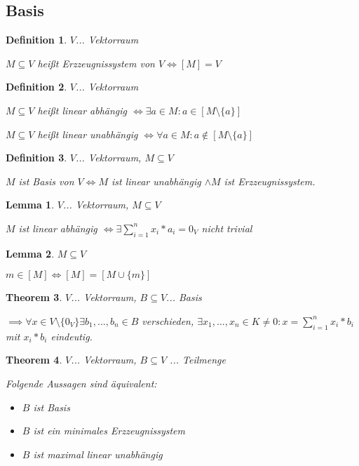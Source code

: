 \documentclass[twocolumn]{article}
\newtheorem{theorem}{Theorem}[section]
\newtheorem{lemma}[theorem]{Lemma}
\newtheorem{definition}{Definition}[section]
\newcommand*{\logeq}{\Leftrightarrow}
\begin{document}
\subsection{Basis}

\begin{definition}
	$V$... Vektorraum
	
	$M \subseteq V$ heißt Erzzeugnissystem von $V \logeq [M]=V$ 
\end{definition}

\begin{definition}
	$V$... Vektorraum
	
	$M \subseteq V$ heißt linear abhängig $\logeq \exists a \in M : a \in [M\setminus \{a\}]$
	
	$M \subseteq V$ heißt linear unabhängig $\logeq \forall a \in M : a \notin [M\setminus \{a\}]$
\end{definition}

\begin{definition}
	$V$... Vektorraum, $M \subseteq V$
	
	$M$ ist Basis von $V \logeq M$ ist linear unabhängig $\land M$ ist Erzzeugnissystem.
\end{definition}

\begin{lemma}
	$V$... Vektorraum, $M \subseteq V$
	
	$M$ ist linear abhängig $\logeq \exists \sum_{i=1}^{n}x_i*a_i=0_V$ nicht trivial
\end{lemma}

\begin{lemma}
	$M \subseteq V$
	
	$m \in [M] \logeq [M] = [M\cup\{m\}]$
\end{lemma}

\begin{theorem}
	$V$... Vektorraum, $B \subseteq V$... Basis
	
	$\implies \forall x \in V\setminus\{0_V\}\exists b_1,...,b_n \in B$ verschieden, $\exists x_1,...,x_n \in K \neq 0 : x=\sum_{i=1}^{n}x_i*b_i$ mit $x_i*b_i$ eindeutig.
\end{theorem}

\begin{theorem}
	$V$... Vektorraum, $B \subseteq V$ ... Teilmenge
	
	Folgende Aussagen sind äquivalent:
	
	\begin{itemize}
		\item $B$ ist Basis
		\item $B$ ist ein minimales Erzzeugnissystem
		\item $B$ ist maximal linear unabhängig
	\end{itemize}
\end{theorem}
\end{document}
